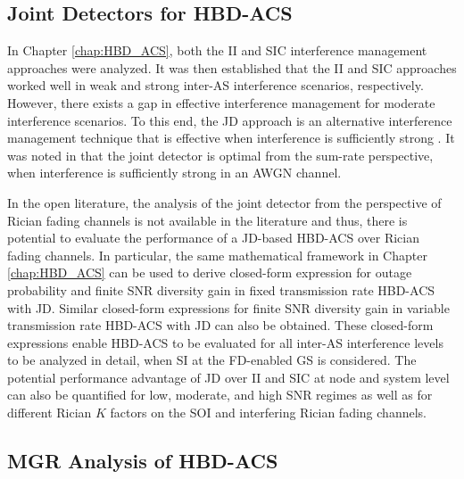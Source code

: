 \subsection{Joint Detectors for HBD-ACS}

In Chapter \ref{chap:HBD_ACS}, both the II and SIC interference management approaches were analyzed. It was then established that the II and SIC approaches worked well in weak and strong inter-AS interference scenarios, respectively. However, there exists a gap in effective interference management for moderate interference scenarios. To this end, the JD approach is an alternative interference management technique that is effective when interference is sufficiently strong \cite{zahavi2017cooperation,zhou2015mac,shubhi2017joint,blomer2009transmission}. It was noted in \cite{zahavi2017cooperation} that the joint detector is optimal from the sum-rate perspective, when interference is sufficiently strong in an AWGN channel. 

In the open literature, the analysis of the joint detector from the perspective of Rician fading channels is not available in the literature and thus, there is potential to evaluate the performance of a JD-based HBD-ACS over Rician fading channels. In particular, the same mathematical framework in Chapter \ref{chap:HBD_ACS} can be used to derive closed-form expression for outage probability and finite SNR diversity gain in fixed transmission rate HBD-ACS with JD. Similar closed-form expressions for finite SNR diversity gain in variable transmission rate HBD-ACS with JD can also be obtained. These closed-form expressions enable HBD-ACS to be evaluated for all inter-AS interference levels to be analyzed in detail, when SI at the FD-enabled GS is considered. The potential performance advantage of JD over II and SIC at node and system level can also be quantified for low, moderate, and high SNR regimes as well as for different Rician $K$ factors on the SOI and interfering Rician fading channels.
 
\subsection{MGR Analysis of HBD-ACS}

